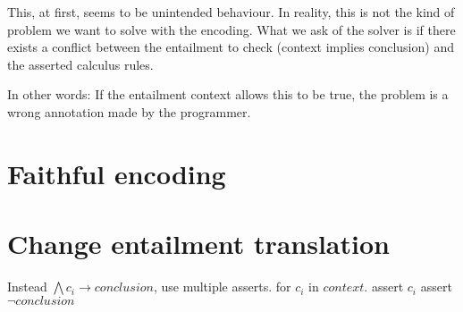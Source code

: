 \documentclass[a4paper]{article}
\begin{document}
This, at first, seems to be unintended behaviour.
In reality, this is not the kind of problem we want to solve with the encoding.
What we ask of the solver is if there exists a conflict between
the entailment to check (context implies conclusion)
and the asserted calculus rules.

In other words: If the entailment context allows this to be true,
the problem is a wrong annotation made by the programmer.

\section{Faithful encoding}

\section{Change entailment translation}
Instead $\bigwedge c_i \rightarrow conclusion$, use multiple asserts.
for $c_i$ in $context$. assert $c_i$
assert $\neg conclusion$

\end{document}
